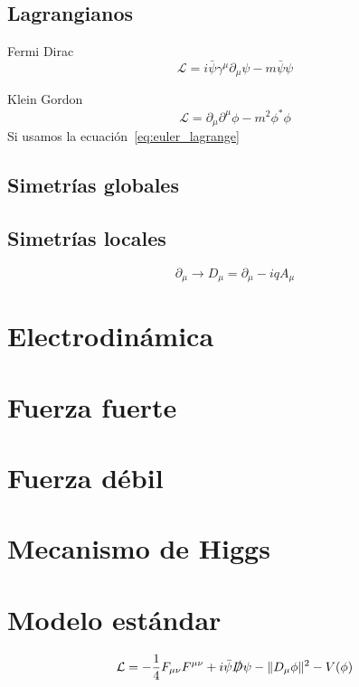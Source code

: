 \documentclass[a4paper]{article}
\newcommand{\Lagr}{\mathcal{L}}
\newcommand{\du}{\partial}
\begin{document}
\subsection{Lagrangianos}\label{ sec:lagrangianos}


\noindent Fermi Dirac
\begin{equation}
\Lagr = i \bar{\psi} \gamma^{\mu} \du_\mu \psi - m \bar{\psi} \psi
\label{eq:fermionic}
\end{equation}

\noindent Klein Gordon
\begin{equation}
\Lagr = \du_\mu \du^\mu \phi - m^2 \phi^* \phi
\end{equation}
Si usamos la ecuación~\ref{eq:euler_lagrange}


\subsection{Simetrías globales}\label{sec:simetras-globales}


\subsection{Simetrías locales}\label{sec:simetras-locales}

\begin{equation}
\du_\mu \to D_\mu = \du_\mu - i q A_\mu
\end{equation}


\section{Electrodinámica}\label{sec:electrodinamica}


\section{Fuerza fuerte}\label{sec:fuerza-fuerte}


\section{Fuerza débil}\label{sec:fuerza-debil}


\section{Mecanismo de Higgs}\label{sec:mecanismo-de-higgs}


\section{Modelo estándar}\label{sec:modelo-estandar}
\[
 \Lagr = - \frac{1}{4} F_{\mu \nu} F^{\mu \nu} + i \bar{\psi} \slashed{D} \psi - \|D_\mu \phi\|^2 - V(\phi) 
\]

\nocite{*}


\end{document}
